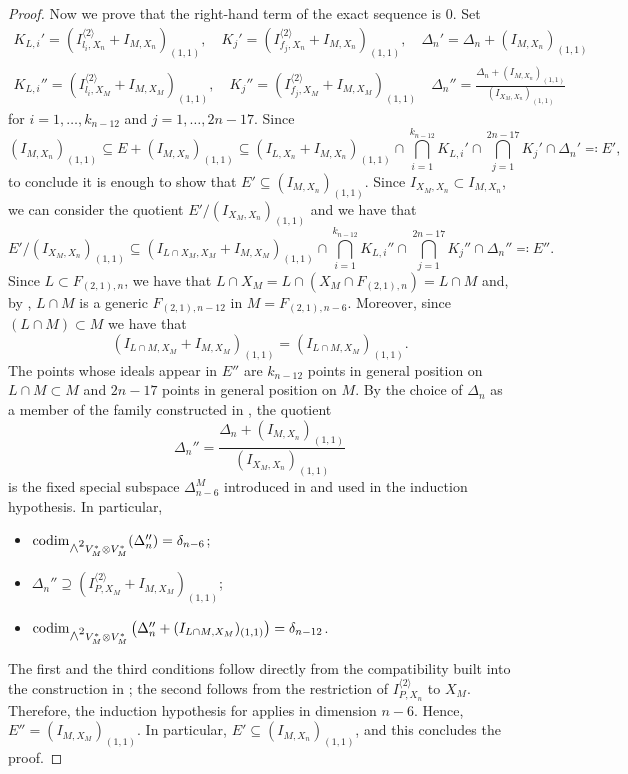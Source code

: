 \documentclass[a4paper,reqno]{amsart}
\theoremstyle{plainnopunct}
\theoremstyle{definitionnopunct}
\newcommand{\superwedge}{\mathlarger{\mathlarger{\wedge}}}
\newcommand{\codim}{\operatorname{codim}}
\begin{document}
\begin{proof}
Now we prove that the right-hand term of the exact sequence is 0. Set
\begin{gather*}K_{L,i}'=(I^{\langle2\rangle}_{l_i,X_n}+I_{M,X_n})_{(1,1)},\quad K_{j}'=(I^{\langle2\rangle}_{f_j,X_n}+I_{M,X_n})_{(1,1)},\quad \Delta_n'=\Delta_n+(I_{M,X_n})_{(1,1)}\\
K_{L,i}''=(I^{\langle2\rangle}_{l_i, X_{M}}+I_{M,X_M})_{(1,1)}, \quad K_{j}''=(I^{\langle2\rangle}_{f_j, X_{M}}+I_{M,X_M})_{(1,1)}\quad \Delta_n''=\frac{\Delta_n+(I_{M,X_n})_{(1,1)}}{(I_{X_M,X_n})_{(1,1)}}
\end{gather*}
for $i=1,\dots,k_{n-12}$ and $j=1,\dots,2n-17$. Since
$$(I_{M,X_n})_{(1,1)}\subseteq E+(I_{M,X_n})_{(1,1)}\subseteq(I_{L,X_n}+I_{M,X_n})_{(1,1)}\cap\bigcap_{i=1}^{k_{n-12}}K_{L,i}'\cap\bigcap_{j=1}^{2n-17}K_j'\cap \Delta_n'\eqcolon E',$$
to conclude it is enough to show that $E'\subseteq(I_{M,X_n})_{(1,1)}$. Since $I_{X_M,X_n}\subset I_{M,X_n}$, we can consider the quotient $E'/(I_{X_M,X_n})_{(1,1)}$ and we have that 
$$E'/(I_{X_M,X_n})_{(1,1)}\subseteq (I_{L\cap X_M, X_M}+I_{M,X_M})_{(1,1)}\cap\bigcap_{i=1}^{k_{n-12}}K_{L,i}''\cap\bigcap_{j=1}^{2n-17}K_j''\cap\Delta_n''\eqcolon E''.$$
Since $L\subset F_{(2,1),n}$, we have that $L\cap X_M=L\cap(X_M\cap F_{(2,1),n})=L\cap M$ and, by , $L\cap M$ is a generic $F_{(2,1),n-12}$ in $M=F_{(2,1),n-6}$. Moreover, since $(L\cap M)\subset M$ we have that 
$$
(I_{L\cap M,X_M}+I_{M,X_M})_{(1,1)}=(I_{L\cap M,X_M})_{(1,1)}.
$$
The points whose ideals appear in $E''$ are $k_{n-12}$ points in general position on $L\cap M\subset M$ and $2n-17$ points in general position on $M$.
By the choice of $\Delta_n$ as a member of the family
constructed in , the quotient
\[
\Delta_n''
=
\frac{
\Delta_n+(I_{M,X_n})_{(1,1)}
}{
(I_{X_M,X_n})_{(1,1)}
}
\]
is the fixed special subspace $\Delta_{n-6}^{M}$ introduced in  and used in the
induction hypothesis. In particular,
\begin{itemize}[leftmargin=*]
    \item {
    $
    \codim_{\superwedge^2V_M^*\otimes V_M^*}
    (\Delta_n'')
    =
    \delta_{n-6}$;
    }

    \item {
    $
    \Delta_n''
    \supseteq
    \left(
    I_{P,X_M}^{\langle2\rangle}
    +
    I_{M,X_M}
    \right)_{(1,1)}$;
    }

    \item {
    $
    \codim_{\superwedge^2V_M^*\otimes V_M^*}
    \left(
    \Delta_n''
    +
    (I_{L\cap M,X_M})_{(1,1)}
    \right)
    =
    \delta_{n-12}$.
    }
\end{itemize}
The first and the third conditions follow directly from the compatibility built into the construction in ; the second follows from the restriction of $I_{P,X_n}^{\langle2\rangle}$ to $X_M$. Therefore, the induction
hypothesis for  applies in dimension $n-6$.
{Hence, $E''
=
\left(
I_{M,X_M}
\right)_{(1,1)}$.
In particular,
$
E'
\subseteq
\left(
I_{M,X_n}
\right)_{(1,1)}$,
and this concludes the proof}.
\end{proof}
\end{document}
